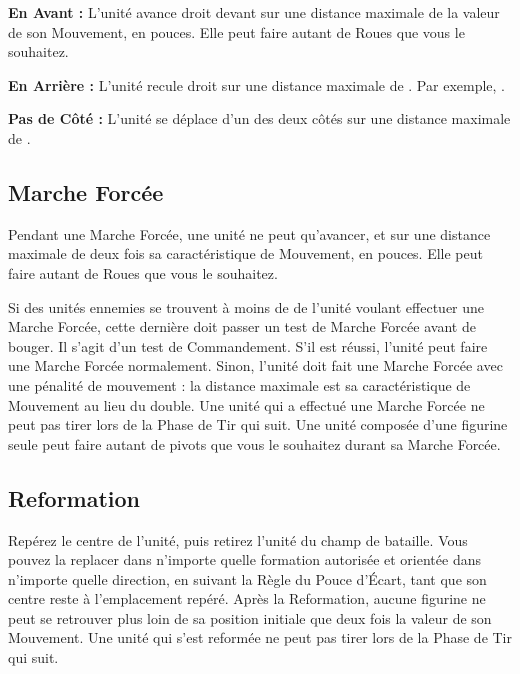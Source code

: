 \noindent\textbf{En Avant :} L'unité avance droit devant sur une distance maximale de la valeur de son Mouvement, en pouces. Elle peut faire autant de Roues que vous le souhaitez.

\noindent\textbf{En Arrière :} L'unité recule droit sur une distance maximale de . Par exemple, .

\noindent\textbf{Pas de Côté :} L'unité se déplace d'un des deux côtés sur une distance maximale de .

\subsection{Marche Forcée}

Pendant une Marche Forcée, une unité ne peut qu'avancer, et sur une distance maximale de deux fois sa caractéristique de Mouvement, en pouces. Elle peut faire autant de Roues que vous le souhaitez. 

Si des unités ennemies se trouvent à moins de  de l'unité voulant effectuer une Marche Forcée, cette dernière doit passer un test de Marche Forcée avant de bouger. Il s'agit d'un test de Commandement. S'il est réussi, l'unité peut faire une Marche Forcée normalement. Sinon, l'unité doit fait une Marche Forcée avec une pénalité de mouvement : la distance maximale est sa caractéristique de Mouvement au lieu du double. Une unité qui a effectué une Marche Forcée ne peut pas tirer lors de la Phase de Tir qui suit. Une unité composée d'une figurine seule peut faire autant de pivots que vous le souhaitez durant sa Marche Forcée.

\subsection{Reformation}

Repérez le centre de l'unité, puis retirez l'unité du champ de bataille. Vous pouvez la replacer dans n'importe quelle formation autorisée et orientée dans n'importe quelle direction, en suivant la Règle du Pouce d'Écart, tant que son centre reste à l'emplacement repéré. Après la Reformation, aucune figurine ne peut se retrouver plus loin de sa position initiale que deux fois la valeur de son Mouvement. Une unité qui s'est reformée ne peut pas tirer lors de la Phase de Tir qui suit.

